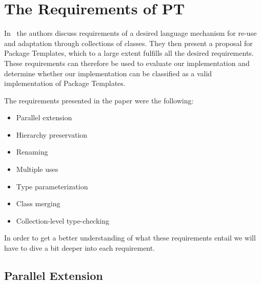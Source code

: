 \section{The Requirements of PT}\label{sec:the-requirements-of-pt}

In~\cite{jot} the authors discuss requirements of a desired language mechanism for re-use and adaptation through collections of classes.
They then present a proposal for Package Templates, which to a large extent fulfills all the desired requirements.
These requirements can therefore be used to evaluate our implementation and determine whether our implementation can be classified as a valid implementation of Package Templates.

The requirements presented in the paper were the following:

\begin{multicols}{2}
    \begin{itemize}
        \item Parallel extension
        \item Hierarchy preservation
        \item Renaming
        \item Multiple uses
        \item Type parameterization
        \item Class merging
        \item Collection-level type-checking
    \end{itemize}
\end{multicols}

In order to get a better understanding of what these requirements entail we will have to dive a bit deeper into each requirement.

\subsection{Parallel Extension}\label{subsec:parallel-extension}
%


